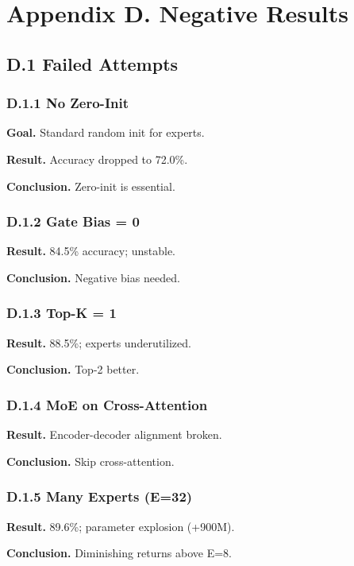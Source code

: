 \section{Appendix D. Negative Results}

\subsection{D.1 Failed Attempts}

\subsubsection{D.1.1 No Zero-Init}

\textbf{Goal.} Standard random init for experts.

\textbf{Result.} Accuracy dropped to 72.0\%.

\textbf{Conclusion.} Zero-init is essential.

\subsubsection{D.1.2 Gate Bias = 0}

\textbf{Result.} 84.5\% accuracy; unstable.

\textbf{Conclusion.} Negative bias needed.

\subsubsection{D.1.3 Top-K = 1}

\textbf{Result.} 88.5\%; experts underutilized.

\textbf{Conclusion.} Top-2 better.

\subsubsection{D.1.4 MoE on Cross-Attention}

\textbf{Result.} Encoder-decoder alignment broken.

\textbf{Conclusion.} Skip cross-attention.

\subsubsection{D.1.5 Many Experts (E=32)}

\textbf{Result.} 89.6\%; parameter explosion (+900M).

\textbf{Conclusion.} Diminishing returns above E=8.

